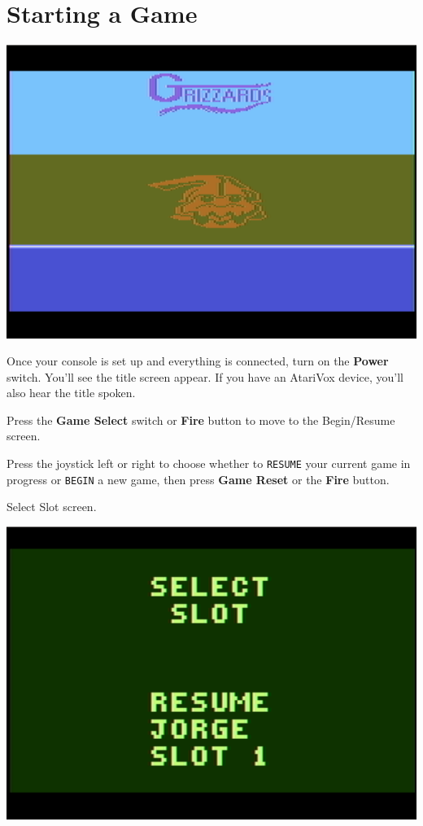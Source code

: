 \documentclass[10pt,twocolumn,openany,article]{memoir}
\begin{document}
\ifdefined\ATARIAGESAVE\vfill\pagebreak\fi

\section{Starting a Game}

\begin{center}
  \includegraphics[width=\columnwidth]{../Manual/TitleAquaxNTSC.png}
\end{center}

Once your  console is set  up and everything  is connected, turn  on the
\textbf{Power} switch. You'll  see the title screen appear.  If you have
an AtariVox device, you'll also hear the title spoken.

Press the \textbf{Game Select} switch or \textbf{Fire} button to move to
the
\ifdefined\NOSAVE
Begin/Resume screen.

Press the  joystick left or  right to choose whether  to \texttt{RESUME}
your current game  in progress or \texttt{BEGIN} a new  game, then press
\textbf{Game Reset} or the \textbf{Fire} button.

\else
Select Slot screen.

\begin{center}
  \includegraphics[width=\columnwidth]{../Manual/SelectSlotNTSC.png}
\end{center}
\end{document}
